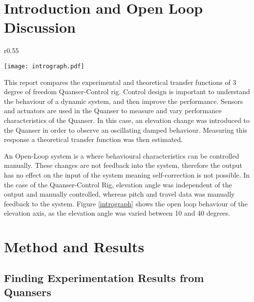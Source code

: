 \section{Introduction and Open Loop
Discussion}\label{introduction-and-open-loop-discussion}

\begin{wrapfigure}{r}{0.55\textwidth}
  \begin{center}
  \vspace{-20pt}
  \texttt{[image: intrograph.pdf]}
  \end{center}
  \caption{Graph Showing the Open Loop Nature of the Experimental Quanser Response}
  \label{intrograph}
  \vspace{-15pt}
\end{wrapfigure}

This report compares the experimental and theoretical transfer functions
of 3 degree of freedom Quanser-Control rig. Control design is important
to understand the behaviour of a dynamic system, and then improve the
performance. Sensors and actuators are used in the Quanser to measure
and vary performance characteristics of the Quanser. In this case, an
elevation change was introduced to the Quanser in order to observe an
oscillating damped behaviour. Measuring this response a theoretical
transfer function was then estimated.

An Open-Loop system is a where behavioural characteristics can be
controlled manually. These changes are not feedback into the system,
therefore the output has no effect on the input of the system
\cite{openloop} meaning self-correction is not possible. In the case of
the Quanser-Control Rig, elevation angle was independent of the output
and manually controlled, whereas pitch and travel data was manually
feedback to the system. Figure \ref{intrograph} shows the open loop
behaviour of the elevation axis, as the elevation angle was varied
between 10 and 40 degrees.

\section{Method and Results}\label{method-and-results}

\subsection{Finding Experimentation Results from
Quansers}\label{finding-experimentation-results-from-quansers}

